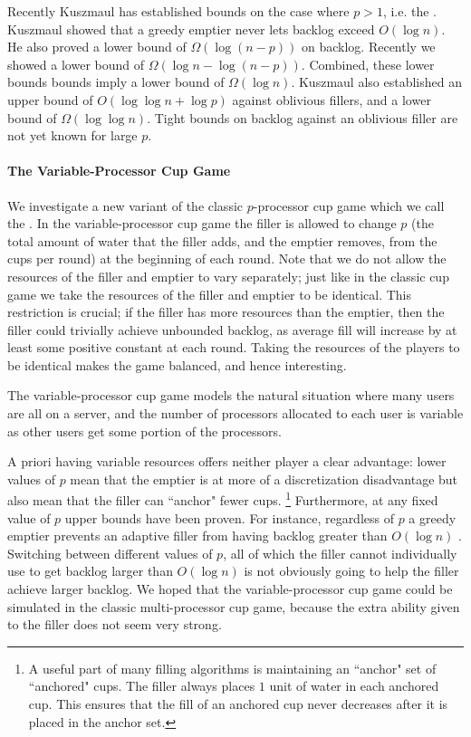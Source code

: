 Recently Kuszmaul has established bounds on the case where $p>1$, i.e. the
 \cite{wku20}. Kuszmaul showed that a greedy
emptier never lets backlog exceed $O(\log n)$. He also proved a lower bound of
$\Omega(\log (n-p))$ on backlog. Recently we showed a lower bound of
$\Omega(\log n - \log (n-p))$. Combined, these lower bounds bounds imply a
lower bound of $\Omega(\log n)$. Kuszmaul also established an upper bound of
$O(\log\log n + \log p)$ against oblivious fillers, and a lower bound of
$\Omega(\log\log n)$. Tight bounds on backlog against an oblivious
filler are not yet known for large $p$.

\paragraph{The Variable-Processor Cup Game}
We investigate a new variant of the classic $p$-processor cup game which we call
the . In the variable-processor cup game the
filler is allowed to change $p$ (the total amount of water that the filler
adds, and the emptier removes, from the cups per round) at the beginning of
each round. Note that we do not allow the resources of the filler and emptier
to vary separately; just like in the classic cup game we take the resources of
the filler and emptier to be identical.
This restriction is crucial; if
the filler has more resources than the emptier, then
the filler could trivially achieve unbounded backlog, as average fill will
increase by at least some positive constant at each round.
Taking the resources of the players to be identical makes the game balanced,
and hence interesting.

The variable-processor cup game models the natural situation
where many users are all on a server, and the number of
processors allocated to each user is variable as other users get
some portion of the processors.

A priori having variable resources offers neither player a clear
advantage: lower values of $p$ mean that the emptier is at more
of a discretization disadvantage but also mean that the filler
can ``anchor" fewer   cups. \footnote{A useful part of many
  filling algorithms is maintaining an ``anchor" set of
  ``anchored" cups. The filler always places $1$ unit of water in
  each anchored cup. This ensures that the fill of an anchored
cup never decreases after it is placed in the anchor set.}
Furthermore, at any fixed value of $p$ upper bounds have been
proven. For instance, regardless of $p$ a greedy emptier prevents
an adaptive filler from having backlog greater than $O(\log n)$
\cite{wku20}. Switching between different values of $p$, all of
which the filler cannot individually use to get backlog larger
than $O(\log n)$ is not obviously going to help the filler
achieve larger backlog. We hoped that the variable-processor cup
game could be simulated in the classic multi-processor cup game,
because the extra ability given to the filler does not seem very
strong. 

